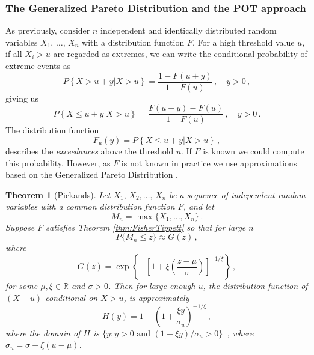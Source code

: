 \documentclass[11pt,a4paper,]{article}
\newtheorem{theorem}{Theorem}[section]
\theoremstyle{definition}
\theoremstyle{definition}
\theoremstyle{definition}
\theoremstyle{remark}
\begin{document}
\subsubsection{The Generalized Pareto Distribution and the POT approach} \label{sec:potapproach}

As previously, consider \(n\) independent and identically distributed random variables \(X_1, \, \ldots, \, X_n\) with a distribution function \(F\). For a high threshold value \(u\), if all \(X_i > u\) are regarded as extremes, we can write the conditional probability of extreme events as
\begin{equation}\label{eq:POT1}
    P\left \{X > u + y | X > u \right \} = \frac{1 - F(u+y)}{1 - F(u)}\, , \quad y >0 \, , 
\end{equation}
giving us
\begin{equation}\label{eq:POT2}
    P\left \{X \leq u + y | X > u \right \} = \frac{ F(u+y) - F(u)}{1 - F(u)}\, , \quad y >0 \, . 
\end{equation}
The distribution function
\begin{equation}\label{eq:POT3}
    F_u(y) = P\left \{X \leq u + y | X > u \right \}\, , 
\end{equation}
describes the \textit{exceedances} above the threshold \(u\). If \(F\) is known we could compute this probability. However, as \(F\) is not known in practice we use approximations based on the Generalized Pareto Distribution \autocite{Pickands1975}.

\begin{theorem}[Pickands] Let $X_1, \, X_2, \ldots, \, X_n$  be a sequence of independent random variables with a common distribution function $F$, and let
$$ M_n = \max \{X_1, \ldots, X_n \} \, . $$
Suppose $F$ satisfies Theorem \ref{thm:FisherTippett} so that for large $n$
$$ P\{ M_n \leq z \} \approx G(z)\, ,  $$
where 
$$  G(z) = \exp\left\{ -\left[ 1 + \xi\left(\frac{z - \mu}{\sigma} \right)\right]^{-1/\xi} \right\}\, , $$
for some $\mu, \xi \in \mathbb{R}$ and $\sigma >0$. Then for large enough $u$, the distribution function of $(X-u)$ conditional on $X > u$, is approximately
\begin{equation}\label{eq:POT4}
    H(y) = 1 - \left( 1 + \frac{\xi y}{\sigma_u} \right)^{-1/\xi}\, , 
\end{equation}
where the domain of $H$ is $\{y: y >0\, \,    \text{and} \, \,  (1 + \xi y)/\sigma_u >0  \}$\, , where $\sigma_u = \sigma + \xi(u- \mu)$. 
\end{theorem}
\end{document}
